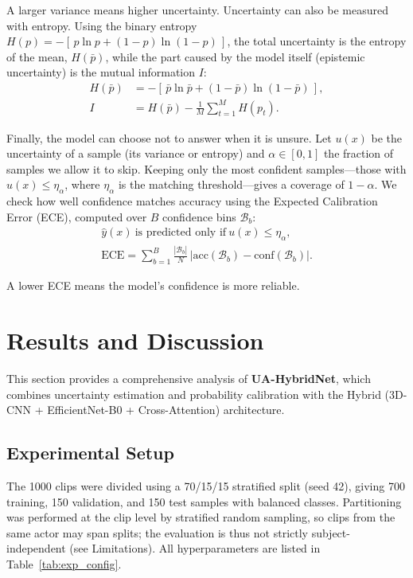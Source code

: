 \documentclass[conference]{IEEEtran}
\begin{document}
A larger variance means higher uncertainty. Uncertainty can also be measured with entropy. Using the binary entropy $H(p) = -[\,p\ln p + (1-p)\ln(1-p)\,]$, the total uncertainty is the entropy of the mean, $H(\bar{p})$, while the part caused by the model itself (epistemic uncertainty) is the mutual information $I$:
\begin{equation}
\begin{aligned}
H(\bar{p}) &= -[\,\bar{p}\ln\bar{p} + (1-\bar{p})\ln(1-\bar{p})\,], \\
I &= H(\bar{p}) - \frac{1}{M}\sum_{t=1}^{M} H(p_t).
\end{aligned}
\end{equation}

Finally, the model can choose not to answer when it is unsure. Let $u(x)$ be the uncertainty of a sample (its variance or entropy) and $\alpha \in [0,1]$ the fraction of samples we allow it to skip. Keeping only the most confident samples---those with $u(x) \le \eta_\alpha$, where $\eta_\alpha$ is the matching threshold---gives a coverage of $1-\alpha$. We check how well confidence matches accuracy using the Expected Calibration Error (ECE), computed over $B$ confidence bins $\mathcal{B}_b$:
\begin{equation}
\begin{gathered}
\hat{y}(x)\ \text{is predicted only if}\ u(x) \le \eta_\alpha, \\
\mathrm{ECE} = \sum_{b=1}^{B} \frac{|\mathcal{B}_b|}{N}\,\big|\mathrm{acc}(\mathcal{B}_b) - \mathrm{conf}(\mathcal{B}_b)\big|.
\end{gathered}
\end{equation}

A lower ECE means the model's confidence is more reliable.

\section{Results and Discussion}

This section provides a comprehensive analysis of \textbf{UA-HybridNet}, which combines uncertainty estimation and probability calibration with the Hybrid (3D-CNN + EfficientNet-B0 + Cross-Attention) architecture.

\subsection{Experimental Setup}
The 1000 clips were divided using a 70/15/15 stratified split (seed 42), giving 700 training, 150 validation, and 150 test samples with balanced classes. Partitioning was performed at the clip level by stratified random sampling, so clips from the same actor may span splits; the evaluation is thus not strictly subject-independent (see Limitations). All hyperparameters are listed in Table~\ref{tab:exp_config}.
\end{document}
